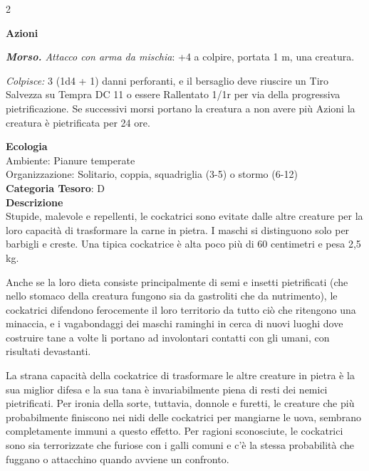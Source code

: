 \begin{multicols}{2}
{\textbf{Azioni}

\emph{\textbf{Morso.} Attacco con arma da mischia}: +4 a colpire, portata 1 m, una creatura.

\emph{Colpisce:} 3 (1d4 + 1) danni perforanti, e il bersaglio deve riuscire un Tiro Salvezza su Tempra DC 11 o essere Rallentato 1/1r per via della progressiva pietrificazione. Se successivi morsi portano la creatura a non avere più Azioni la creatura è pietrificata per 24 ore.

\textbf{Ecologia}\\
Ambiente: Pianure temperate\\
Organizzazione: Solitario, coppia, squadriglia (3-5) o stormo (6-12)\\
\textbf{Categoria Tesoro}: D\\
\textbf{Descrizione}\\
Stupide, malevole e repellenti, le cockatrici sono evitate dalle altre creature per la loro capacità di trasformare la carne in pietra. I maschi si distinguono solo per barbigli e creste. Una tipica cockatrice è alta poco più di 60 centimetri e pesa 2,5 kg.

Anche se la loro dieta consiste principalmente di semi e insetti pietrificati (che nello stomaco della creatura fungono sia da gastroliti che da nutrimento), le cockatrici difendono ferocemente il loro territorio da tutto ciò che ritengono una minaccia, e i vagabondaggi dei maschi raminghi in cerca di nuovi luoghi dove costruire tane a volte li portano ad involontari contatti con gli umani, con risultati devastanti.

La strana capacità della cockatrice di trasformare le altre creature in pietra è la sua miglior difesa e la sua tana è invariabilmente piena di resti dei nemici pietrificati. Per ironia della sorte, tuttavia, donnole e furetti, le creature che più probabilmente finiscono nei nidi delle cockatrici per mangiarne le uova, sembrano completamente immuni a questo effetto. Per ragioni sconosciute, le cockatrici sono sia terrorizzate che furiose con i galli comuni e c'è la stessa probabilità che fuggano o attacchino quando avviene un confronto.

}
\end{multicols}
